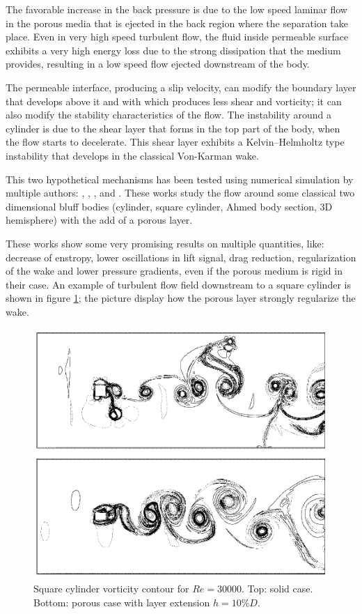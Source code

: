 The favorable increase in the back pressure is due to the low speed laminar flow in the porous media that is ejected in the back region where the separation take place.
Even in very high speed turbulent flow, the fluid inside permeable surface exhibits a very high energy loss due to the strong dissipation that the medium provides, resulting in a low speed flow ejected downstream of the body.

The permeable interface, producing a slip velocity, can modify the boundary layer that develops above it and with which produces less shear and vorticity; it can also modify the stability characteristics of the flow.
The instability around a cylinder is due to the shear layer that forms in the top part of the body, when the flow starts to decelerate.
This shear layer exhibits a Kelvin–Helmholtz type instability that develops in the classical Von-Karman wake.

This two hypothetical mechanisms has been tested using numerical simulation by multiple authors: \citet{bruneau2004passive}, \citet{bruneau2008numerical}, \citet{bhattacharyya2011reduction}, \citet{naito2012numerical} and \citet{mimeau2017passive}.
These works study the flow around some classical two dimensional bluff bodies (cylinder, square cylinder, Ahmed body section, 3D hemisphere) with the add of a porous layer.

These works show some very promising results on multiple quantities, like: decrease of enstropy, lower oscillations in lift signal, drag reduction, regularization of the wake and lower pressure gradients, even if the porous medium is rigid in their case.
An example of turbulent flow field downstream to a square cylinder is shown in figure \ref{fig:porous_cylinder}; the picture display how the porous layer strongly regularize the wake.

\begin{figure}[h]
	\centering
	\includegraphics[width=0.7\linewidth]{chapter_1/cylinder_porous}
	\caption{Square cylinder vorticity contour for $Re=30000$. Top: solid case. Bottom: porous case with layer extension $h=10\% D$.}
	\label{fig:porous_cylinder}
\end{figure}


